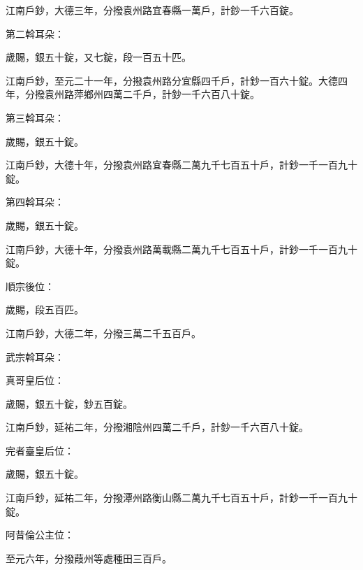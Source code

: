 \begin{pinyinscope}
 江南戶鈔，大德三年，分撥袁州路宜春縣一萬戶，計鈔一千六百錠。



 第二斡耳朵：



 歲賜，銀五十錠，又七錠，段一百五十匹。



 江南戶鈔，至元二十一年，分撥袁州路分宜縣四千戶，計鈔一百六十錠。大德四年，分撥袁州路萍鄉州四萬二千戶，計鈔一千六百八十錠。



 第三斡耳朵：



 歲賜，銀五十錠。



 江南戶鈔，大德十年，分撥袁州路宜春縣二萬九千七百五十戶，計鈔一千一百九十錠。



 第四斡耳朵：



 歲賜，銀五十錠。



 江南戶鈔，大德十年，分撥袁州路萬載縣二萬九千七百五十戶，計鈔一千一百九十錠。



 順宗後位：



 歲賜，段五百匹。



 江南戶鈔，大德二年，分撥三萬二千五百戶。



 武宗斡耳朵：



 真哥皇后位：



 歲賜，銀五十錠，鈔五百錠。



 江南戶鈔，延祐二年，分撥湘陰州四萬二千戶，計鈔一千六百八十錠。



 完者臺皇后位：



 歲賜，銀五十錠。



 江南戶鈔，延祐二年，分撥潭州路衡山縣二萬九千七百五十戶，計鈔一千一百九十錠。



 阿昔倫公主位：



 至元六年，分撥葭州等處種田三百戶。




\end{pinyinscope}

